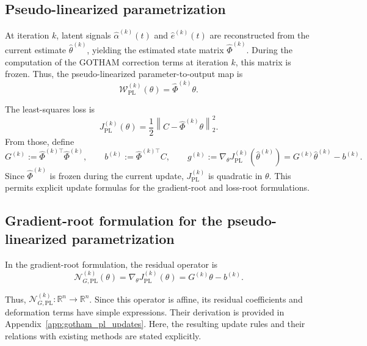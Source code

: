 \documentclass[11pt]{article}
\theoremstyle{remark}
\begin{document}
\subsection{Pseudo-linearized parametrization}

\label{subsec:GOTHAM_PL_parametrization}

At iteration $k$, latent signals $\hat{\alpha}^{(k)}(t)$ and $\hat e^{(k)}(t)$ are reconstructed from the current estimate $\hat{\theta}^{(k)}$, yielding the estimated state matrix $\hat{\Phi}^{(k)}$. During the computation of the GOTHAM correction terms at iteration $k$, this matrix is frozen. Thus, the pseudo-linearized parameter-to-output map is
\begin{equation}
\label{eq:WS_pseudolinear_operator_k}
    \mathcal{W}_{\mathrm{PL}}^{(k)}(\theta)
    =
    \hat{\Phi}^{(k)}\theta.
\end{equation}

The least-squares loss is
\begin{equation}
\label{eq:WS_loss_k}
    J_{\mathrm{PL}}^{(k)}(\theta)
    =
    \frac{1}{2}
    \left\|
    C-\hat{\Phi}^{(k)}\theta
    \right\|_2^2.
\end{equation}
From those, define
\begin{equation}
\label{eq:WS_gradient_hessian_definitions}
    G^{(k)}
    :=
    \hat{\Phi}^{(k)\top}\hat{\Phi}^{(k)},
    \qquad
    b^{(k)}
    :=
    \hat{\Phi}^{(k)\top}C,
    \qquad
    g^{(k)}
    :=
    \nabla_{\theta}J_{\mathrm{PL}}^{(k)}(\hat{\theta}^{(k)})
    =
    G^{(k)}\hat{\theta}^{(k)}-b^{(k)}.
\end{equation}
Since $\hat{\Phi}^{(k)}$ is frozen during the current update, $J_{\mathrm{PL}}^{(k)}$ is quadratic in $\theta$. This permits explicit update formulas for the gradient-root and loss-root formulations.

\subsection{Gradient-root formulation for the pseudo-linearized parametrization}
\label{subsec:GOTHAM_PL_gradient_root}

In the gradient-root formulation, the residual operator is
\begin{equation}
\label{eq:gradient_root_operator}
    \mathcal{N}_{G,\mathrm{PL}}^{(k)}(\theta)
    =
    \nabla_{\theta}J_{\mathrm{PL}}^{(k)}(\theta)
    =
    G^{(k)}\theta-b^{(k)}.
\end{equation}

Thus, $\mathcal N_{G,\mathrm{PL}}^{(k)}:\mathbb R^n\to\mathbb R^n$.
Since this operator is affine, its residual coefficients and deformation
terms have simple expressions. Their derivation is provided in
Appendix~\ref{app:gotham_pl_updates}. Here, the resulting update rules
and their relations with existing methods are stated explicitly.
\end{document}

